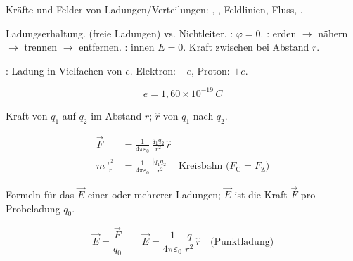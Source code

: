 

\begin{runintext}
Kräfte und Felder von Ladungen/Verteilungen: , , Feldlinien, Fluss, .
\end{runintext}

\begin{runintext}
Ladungserhaltung.  (freie Ladungen) vs. Nichtleiter. : $\varphi=0$. : erden $\to$ nähern $\to$ trennen $\to$ entfernen. : innen $E=0$. Kraft zwischen  bei Abstand $r$.
\end{runintext}
\begin{defbox}[Elementarladung]
: Ladung in Vielfachen von $e$. Elektron: $-e$, Proton: $+e$.
\end{defbox}
\begin{formulabox}
\[ e = 1{,}60 \times 10^{-19}\,\si{C} \]
\end{formulabox}
\begin{defbox}
Kraft von $q_1$ auf $q_2$ im Abstand $r$; $\hat{r}$ von $q_1$ nach $q_2$.
\end{defbox}
\begin{formulabox}
\[ \begin{aligned}
\vec{F} &= \frac{1}{4\pi\varepsilon_0}\,\frac{q_1 q_2}{r^2}\,\hat{r} \\[-1pt]
m\,\frac{v^2}{r} &= \frac{1}{4\pi\varepsilon_0}\,\frac{|q_1 q_2|}{r^2} \quad \text{Kreisbahn ($F_{\mathrm{C}} = F_{\mathrm{Z}}$)}
\end{aligned} \]
\end{formulabox}

\begin{runintext}
Formeln für das  $\vec{E}$ einer oder mehrerer Ladungen; $\vec{E}$ ist die Kraft $\vec{F}$ pro Probeladung $q_0$.
\end{runintext}
\begin{formulabox}
\[ \vec{E} = \frac{\vec{F}}{q_0} \qquad \vec{E} = \frac{1}{4\pi\varepsilon_0}\,\frac{q}{r^2}\,\hat{r} \quad \text{(Punktladung)} \]
\end{formulabox}

